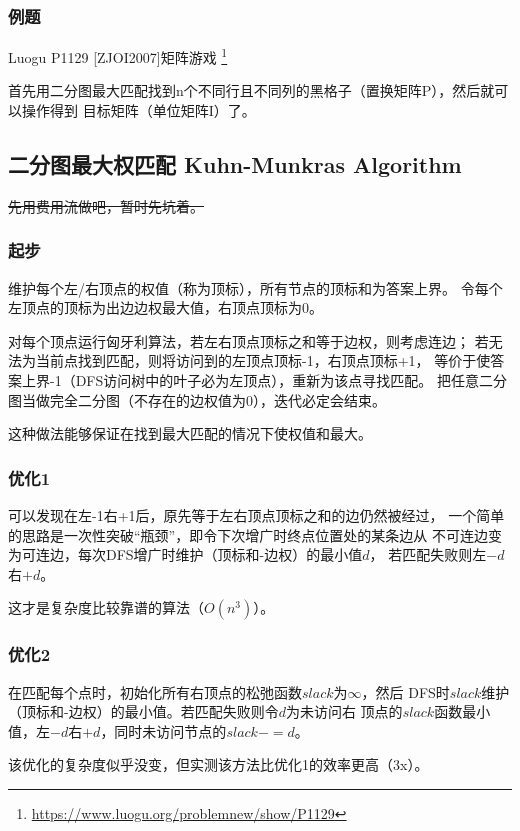 \subsubsection{例题}

Luogu P1129 [ZJOI2007]矩阵游戏
\footnote{\url{https://www.luogu.org/problemnew/show/P1129}}

首先用二分图最大匹配找到n个不同行且不同列的黑格子（置换矩阵P），然后就可以操作得到
目标矩阵（单位矩阵I）了。



\subsection{二分图最大权匹配 Kuhn-Munkras Algorithm}
\sout{先用费用流做吧，暂时先坑着。}
\subsubsection{起步}
维护每个左/右顶点的权值（称为顶标），所有节点的顶标和为答案上界。
令每个左顶点的顶标为出边边权最大值，右顶点顶标为0。

对每个顶点运行匈牙利算法，若左右顶点顶标之和等于边权，则考虑连边；
若无法为当前点找到匹配，则将访问到的左顶点顶标-1，右顶点顶标+1，
等价于使答案上界-1（DFS访问树中的叶子必为左顶点），重新为该点寻找匹配。
把任意二分图当做完全二分图（不存在的边权值为0），迭代必定会结束。

这种做法能够保证在找到最大匹配的情况下使权值和最大。
\subsubsection{优化1}
可以发现在左-1右+1后，原先等于左右顶点顶标之和的边仍然被经过，
一个简单的思路是一次性突破``瓶颈''，即令下次增广时终点位置处的某条边从
不可连边变为可连边，每次DFS增广时维护（顶标和-边权）的最小值$d$，
若匹配失败则左$-d$右$+d$。

这才是复杂度比较靠谱的算法（$O(n^3)$）。
\subsubsection{优化2}
在匹配每个点时，初始化所有右顶点的松弛函数$slack$为$\infty$，然后
DFS时$slack$维护（顶标和-边权）的最小值。若匹配失败则令$d$为未访问右
顶点的$slack$函数最小值，左$-d$右$+d$，同时未访问节点的$slack-=d$。

该优化的复杂度似乎没变，但实测该方法比优化1的效率更高（3x）。
